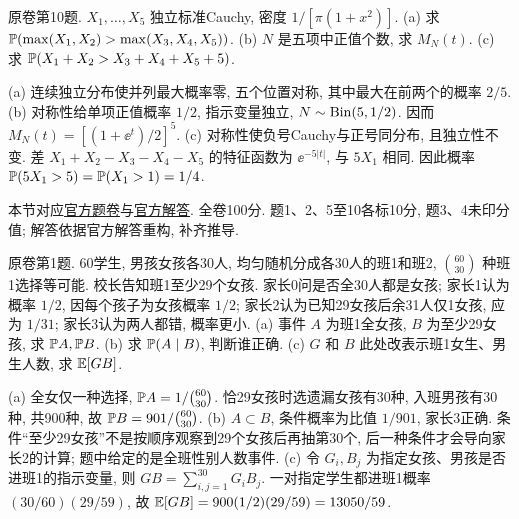 \begin{exercise}\label{ex:fl19-10}
原卷第10题. $X_1,\ldots,X_5$ 独立标准Cauchy, 密度 $1/[\pi(1+x^2)]$. (a) 求 $\mathbb P(\max(X_1,X_2)>\max(X_3,X_4,X_5))$. (b) $N$ 是五项中正值个数, 求 $M_N(t)$. (c) 求 $\mathbb P(X_1+X_2>X_3+X_4+X_5+5)$.
\end{exercise}
\begin{solution}
(a)\label{sol:fl19-10-a} 连续独立分布使并列最大概率零, 五个位置对称, 其中最大在前两个的概率 $2/5$.
(b)\label{sol:fl19-10-b} 对称性给单项正值概率 $1/2$, 指示变量独立, $N\sim\operatorname{Bin}(5,1/2)$. 因而 $M_N(t)=[(1+\ee^t)/2]^5$.
(c)\label{sol:fl19-10-c} 对称性使负号Cauchy与正号同分布, 且独立性不变. 差 $X_1+X_2-X_3-X_4-X_5$ 的特征函数为 $\ee^{-5|t|}$, 与 $5X_1$ 相同. 因此概率 $\mathbb P(5X_1>5)=\mathbb P(X_1>1)=1/4$.
\end{solution}

本节对应\href{https://ocw.mit.edu/courses/18-600-probability-and-random-variables-fall-2019/resources/mit18_600f19_final_f2019/}{官方题卷}与\href{https://ocw.mit.edu/courses/18-600-probability-and-random-variables-fall-2019/resources/mit18_600f19_final_f2019_soln/}{官方解答}. 全卷100分. 题1、2、5至10各标10分, 题3、4未印分值; 解答依据官方解答重构, 补齐推导.

\begin{exercise}\label{ex:flf19-1}
原卷第1题. 60学生, 男孩女孩各30人, 均匀随机分成各30人的班1和班2, $\binom{60}{30}$ 种班1选择等可能. 校长告知班1至少29个女孩. 家长0问是否全30人都是女孩; 家长1认为概率 $1/2$, 因每个孩子为女孩概率 $1/2$; 家长2认为已知29女孩后余31人仅1女孩, 应为 $1/31$; 家长3认为两人都错, 概率更小. (a) 事件 $A$ 为班1全女孩, $B$ 为至少29女孩, 求 $\mathbb P A,\mathbb P B$. (b) 求 $\mathbb P(A\mid B)$, 判断谁正确. (c) $G$ 和 $B$ 此处改表示班1女生、男生人数, 求 $\mathbb E[GB]$.
\end{exercise}
\begin{solution}
(a)\label{sol:flf19-1-a} 全女仅一种选择, $\mathbb P A=1/\binom{60}{30}$. 恰29女孩时选遗漏女孩有30种, 入班男孩有30种, 共900种, 故 $\mathbb P B=901/\binom{60}{30}$.
(b)\label{sol:flf19-1-b} $A\subset B$, 条件概率为比值 $1/901$, 家长3正确. 条件``至少29女孩''不是按顺序观察到29个女孩后再抽第30个, 后一种条件才会导向家长2的计算; 题中给定的是全班性别人数事件.
(c)\label{sol:flf19-1-c} 令 $G_i,B_j$ 为指定女孩、男孩是否进班1的指示变量, 则 $GB=\sum_{i,j=1}^{30}G_iB_j$. 一对指定学生都进班1概率 $(30/60)(29/59)$, 故 $\mathbb E[GB]=900(1/2)(29/59)=13050/59$.
\end{solution}

